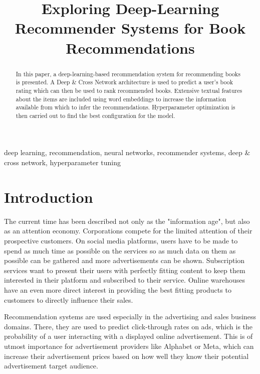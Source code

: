 \documentclass[10pt,final,journal,a4paper,oneside,twocolumn]{IEEEtran}
\begin{document}
\title{Exploring Deep-Learning Recommender Systems for Book Recommendations}

\author{
}

\maketitle

\begin{abstract}
In this paper, a deep-learning-based recommendation system for recommending books is presented. A Deep \& Cross Network architecture is used to predict a user's book rating which can then be used to rank recommended books. Extensive textual features about the items are included using word embeddings to increase the information available from which to infer the recommendations. Hyperparameter optimization is then carried out to find the best configuration for the model.
\end{abstract}

\begin{IEEEkeywords}
deep learning, recommendation, neural networks, recommender systems, deep \& cross network, hyperparameter tuning
\end{IEEEkeywords}

\section{Introduction}
The current time has been described not only as the "information age", but also as an attention economy. Corporations compete for the limited attention of their prospective customers. On social media platforms, users have to be made to spend as much time as possible on the services so as much data on them as possible can be gathered and more advertisements can be shown. Subscription services want to present their users with perfectly fitting content to keep them interested in their platform and subscribed to their service. Online warehouses have an even more direct interest in providing the best fitting products to customers to directly influence their sales.

Recommendation systems are used especially in the advertising and sales business domains. There, they are used to predict click-through rates on ads, which is the probability of a user interacting with a displayed online advertisement. This is of utmost importance for advertisement providers like Alphabet or Meta, which can increase their advertisement prices based on how well they know their potential advertisement target audience. 
\end{document}
